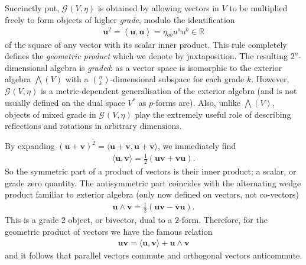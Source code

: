 \documentclass[12pt,a4paper]{article}
\renewcommand{\vb}[1]{\boldsymbol{#1}}
\renewcommand{\ip}[2]{\left\langle#1,#2\right\rangle}
\newcommand{\GA}[1][]{\mathcal{G}_{#1}}
\newcommand{\RR}{\mathds{R}}
\begin{document}
Succinctly put, $\GA(V, \eta{})$ is obtained by allowing vectors in $V$ to be multiplied freely to form objects of higher \emph{grade}, modulo the identification
\begin{align}
	\label{eqn:vector-square}
	\vb{u}^2 = \ip{\vb{u}}{\vb{u}} = \eta{}_{ab}u^au^b \in \RR
\end{align}
of the square of any vector with its scalar inner product.
This rule completely defines the \emph{geometric product} which we denote by juxtaposition.
The resulting $2^n$-dimensional algebra is \emph{graded}: as a vector space is isomorphic to the exterior algebra $\bigwedge(V)$ with a $\binom{n}{k}$-dimensional subspace for each grade $k$.
However, $\GA(V, \eta{})$ is a metric-dependent generalisation of the exterior algebra (and is not usually defined on the dual space $V^*$ as $p$-forms are).
Also, unlike $\bigwedge(V)$, objects of mixed grade in  $\GA(V, \eta{})$ play the extremely useful role of describing reflections and rotations in arbitrary dimensions.

By expanding $(\vb{u}{} + \vb{v}{})^2 = \langle\vb{u}{} + \vb{v}{}, \vb{u}{} + \vb{v}{}\rangle$, we immediately find
\begin{align}
	\langle\vb{u}{}, \vb{v}{}\rangle = \frac12(\vb{u}{}\vb{v}{} + \vb{v}{}\vb{u}{})
.\end{align}
So the symmetric part of a product of vectors is their inner product; a scalar, or grade zero quantity.
The antisymmetric part coincides with the alternating wedge product familiar to exterior algebra (only now defined on vectors, not co-vectors)
\begin{align}
	\vb{u}{} \wedge{} \vb{v}{} = \frac12(\vb{u}{}\vb{v}{} - \vb{v}{}\vb{u}{})
.\end{align}
This is a grade $2$ object, or bivector, dual to a $2$-form.
Therefore, for the geometric product of vectors we have the famous relation
\begin{align}
	\vb{u}{}\vb{v}{} = \langle\vb{u}{}, \vb{v}{}\rangle + \vb{u}{}\wedge{}\vb{v}{}
\end{align}
and it follows that parallel vectors commute and orthogonal vectors anticommute.
\end{document}
